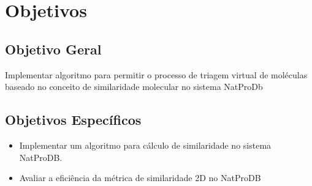                   

\section{Objetivos}

\subsection{Objetivo Geral}

Implementar algoritmo para permitir o processo de triagem virtual de moléculas baseado no conceito de similaridade molecular no sistema NatProDb

\subsection{Objetivos Espec\'ificos}

\begin{itemize}
	\item Implementar um algoritmo para cálculo de similaridade no sistema NatProDB.
	\item Avaliar a eficiência da métrica de similaridade 2D no NatProDB
\end{itemize}


